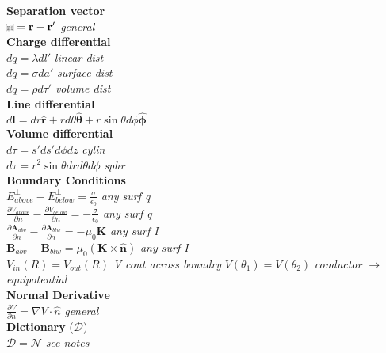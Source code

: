 \documentclass[9pt]{extarticle}
\def\brcurs{{\mbox{$\resizebox{.09in}{.08in}{\texttt{[image: BoldR]}}$}}}
\begin{document}
\begin{multicols}{3}

\textbf{Separation vector} \\
$\brcurs = \mathbf{r} - \mathbf{r'}$ \textit{general} \\
\textbf{Charge differential} \\
$dq = \lambda dl'$ \textit{linear dist} \\
$dq = \sigma da'$ \textit{surface dist} \\
$dq = \rho d\tau'$ \textit{volume dist} \\
\textbf{Line differential} \\
$d\mathbf{l} = dr\hat{\mathbf{r}} + rd\theta \hat{\mathbf{\theta}} + r\sin{\theta}d\phi \hat{\mathbf{\phi}}$ \\
\textbf{Volume differential} \\
$d\tau = s'ds'd\phi dz$ \textit{cylin} \\
$d\tau = r^{2}\sin\theta dr d\theta d\phi $ \textit{sphr} \\
\textbf{Boundary Conditions} \\
$E^{\perp}_{above} - E^{\perp}_{below} = \frac{\sigma}{\epsilon_{0}}$ \textit{any surf q} \\
$\frac{\partial V_{above}}{\partial n} - \frac{\partial V_{below}}{\partial n} = -\frac{\sigma}{\epsilon_{0}}$ \textit{any surf q} \\
$\frac{\partial\mathbf{A}_{abv}}{\partial n} - \frac{\partial\mathbf{A}_{blw}}{\partial n} = -\mu_{0}\mathbf{K}$ \textit{any surf I} \\
$\mathbf{B}_{abv} - \mathbf{B}_{blw} = \mu_{0}(\mathbf{K}\times\mathbf{\hat{n}})$ \textit{any surf I} \\
$V_{in}(R) = V_{out}(R)$ \textit{V cont across boundry}
$V(\theta_{1}) = V(\theta_{2})$ \textit{conductor $\rightarrow$  equipotential} \\
\textbf{Normal Derivative} \\
$\frac{\partial V}{\partial n} = \nabla V \cdot \hat{n}$ \textit{general} \\
\textbf{Dictionary} ($\mathcal{D}$) \\
$\mathcal{D} = \mathcal{N}$ \textit{see notes} \\

\end{multicols}
\end{document}
